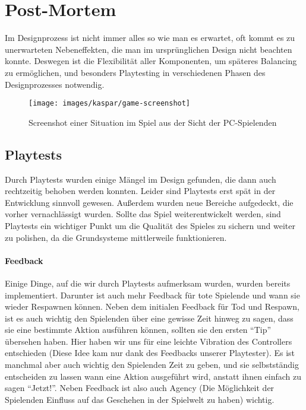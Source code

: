 \chapter{Post-Mortem}

Im Designprozess ist nicht immer alles so wie man es erwartet, oft kommt es zu unerwarteten Nebeneffekten, die man im ursprünglichen Design nicht beachten konnte. Deswegen ist die Flexibilität aller Komponenten, um späteres Balancing zu ermöglichen, und besonders Playtesting in verschiedenen Phasen des Designprozesses notwendig.

\begin{figure}[H]
	\centering
	\texttt{[image: images/kaspar/game-screenshot]}
	\caption{Screenshot einer Situation im Spiel aus der Sicht der PC-Spielenden}
\end{figure}

\section{Playtests}

Durch Playtests wurden einige Mängel im Design gefunden, die dann auch rechtzeitig behoben werden konnten. Leider sind Playtests erst spät in der Entwicklung sinnvoll gewesen. Außerdem wurden neue Bereiche aufgedeckt, die vorher vernachlässigt wurden. Sollte das Spiel weiterentwickelt werden, sind Playtests ein wichtiger Punkt um die Qualität des Spieles zu sichern und weiter zu polishen, da die Grundsysteme mittlerweile funktionieren.

\subsubsection{Feedback}

Einige Dinge, auf die wir durch Playtests aufmerksam wurden, wurden bereits implementiert. Darunter ist auch mehr Feedback für tote Spielende und wann sie wieder Respawnen können. Neben dem initialen Feedback für Tod und Respawn, ist es auch wichtig den Spielenden über eine gewisse Zeit hinweg zu sagen, dass sie eine bestimmte Aktion ausführen können, sollten sie den ersten "`Tip"' übersehen haben. Hier haben wir uns für eine leichte Vibration des Controllers entschieden (Diese Idee kam nur dank des Feedbacks unserer Playtester). Es ist manchmal aber auch wichtig den Spielenden Zeit zu geben, und sie selbstständig entscheiden zu lassen wann eine Aktion ausgeführt wird, anstatt ihnen einfach zu sagen "`Jetzt!"'. Neben Feedback ist also auch Agency (Die Möglichkeit der Spielenden Einfluss auf das Geschehen in der Spielwelt zu haben\cite[S.98]{_game_design_workshop}) wichtig.

